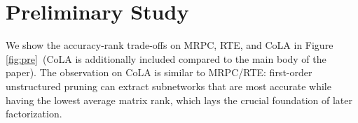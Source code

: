 \documentclass[11pt]{article}
\newcommand{\figref}[1]{Figure \ref{#1}}
\begin{document}
	\appendix
	\section{Preliminary Study}
	We show the accuracy-rank trade-offs on MRPC, RTE, and CoLA in \figref{fig:pre}~(CoLA is additionally included compared to the main body of the paper). The observation on CoLA is similar to MRPC/RTE: first-order unstructured pruning can extract subnetworks that are most accurate while having the lowest average matrix rank, which lays the crucial foundation of later factorization.

\end{document}
